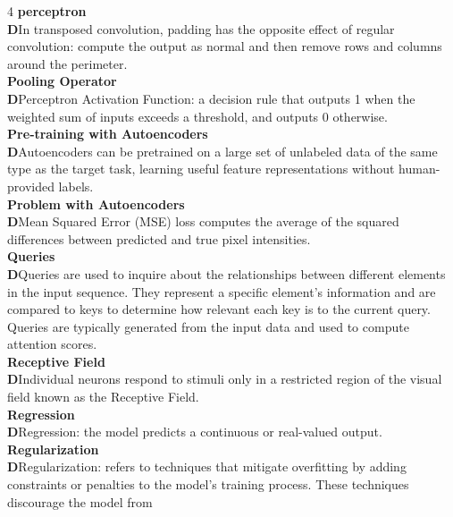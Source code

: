 \documentclass[8pt]{extarticle}
\newcommand{\dtag}{\textcolor{definitioncolor}{\tiny\textbf{D}}\;}
\begin{document}
\begin{multicols}{4}
\vspace{2pt}\textbf{perceptron}\\
\dtag In transposed convolution, padding has the opposite effect of regular convolution: compute the output as normal and then remove rows and columns around the perimeter.\\
\vspace{2pt}\textbf{Pooling Operator}\\
\dtag Perceptron Activation Function: a decision rule that outputs 1 when the weighted sum of inputs exceeds a threshold, and outputs 0 otherwise.\\
\vspace{2pt}\textbf{Pre‑training with Autoencoders}\\
\dtag Autoencoders can be pretrained on a large set of unlabeled data of the same type as the target task, learning useful feature representations without human-provided labels.\\
\vspace{2pt}\textbf{Problem with Autoencoders}\\
\dtag Mean Squared Error (MSE) loss computes the average of the squared differences between predicted and true pixel intensities.\\
\vspace{2pt}\textbf{Queries}\\
\dtag Queries are used to inquire about the relationships between different elements in the input sequence. They represent a specific element's information and are compared to keys to determine how relevant each key is to the current query. Queries are typically generated from the input data and used to compute attention scores.\\
\vspace{2pt}\textbf{Receptive Field}\\
\dtag Individual neurons respond to stimuli only in a restricted region of the visual field known as the Receptive Field.\\
\vspace{2pt}\textbf{Regression}\\
\dtag Regression: the model predicts a continuous or real-valued output.\\
\vspace{2pt}\textbf{Regularization}\\
\dtag Regularization: refers to techniques that mitigate overfitting by adding constraints or penalties to the model's training process. These techniques discourage the model from\\

\end{multicols}
\end{document}
